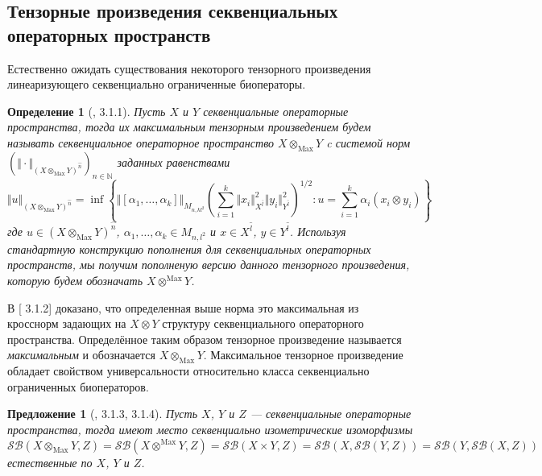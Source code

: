 \documentclass[12pt]{article}
\newtheorem{proposition}[theorem]{Предложение}
\newtheorem{definition}[theorem]{Определение}
\begin{document}
\subsection{Тензорные произведения секвенциальных операторных пространств}

Естественно ожидать существования некоторого тензорного произведения линеаризующего секвенциально ограниченные биоператоры. 
\begin{definition}[\cite{LamOpFolgen}, 3.1.1]\label{DefSQMaxTenProd}
Пусть $X$ и $Y$ секвенциальные операторные пространства, тогда их максимальным тензорным произведением будем называть секвенциальное операторное пространство $X\otimes_{\mathrm{Max}}Y$ c системой норм 
$(\Vert\cdot\Vert_{(X\otimes_{\mathrm{Max}}Y)^{\wideparen{n}}})_{n\in\mathbb{N}}$ заданных равенствами
$$
\Vert u\Vert_{(X\otimes_{\mathrm{Max}}Y)^{\wideparen{n}}}
=\inf\left\{\Vert[\alpha_1,\ldots,\alpha_k]\Vert_{M_{n,kl^2}}\left(\sum\limits_{i=1}^k\Vert x_i\Vert_{X^{\wideparen{l}}}^2\Vert y_i\Vert_{Y^{\wideparen{l}}}^2 \right)^{1/2}:u=\sum\limits_{i=1}^k\alpha_i(x_i\otimes y_i)\right\}
$$
где $u\in (X\otimes_{\mathrm{Max}}Y)^{\wideparen{n}}$, $\alpha_1,\ldots,\alpha_k\in M_{n,l^2}$ и $x\in X^{\wideparen{l}}$, $y\in Y^{\wideparen{l}}$. Используя стандартную конструкцию пополнения 
для секвенциальных операторных пространств, мы получим пополненую версию данного тензорного произведения, которую будем обозначать $X\otimes^{\mathrm{Max}} Y$.
\end{definition}

В [\cite{LamOpFolgen} 3.1.2] доказано, что определенная выше норма это максимальная из кросснорм задающих на $X\otimes Y$ структуру секвенциального операторного пространства. Определённое таким образом 
тензорное произведение называется \textit{максимальным} и обозначается $X \otimes_{\mathrm{Max}} Y$. Максимальное тензорное произведение обладает свойством универсальности относительно класса 
секвенциально ограниченных биоператоров.

\begin{proposition}[\cite{LamOpFolgen}, 3.1.3, 3.1.4]\label{PrSQUnivPropMaxTenProd}
Пусть $X$, $Y$ и $Z$ --- секвенциальные операторные пространства, тогда 	имеют место секвенциально изометрические изоморфизмы
$$
\mathcal{SB}(X\otimes_{\mathrm{Max}}Y, Z)
=\mathcal{SB}(X\otimes^{\mathrm{Max}}Y, Z)
=\mathcal{SB}(X\times Y, Z)
=\mathcal{SB}(X,\mathcal{SB}(Y,Z))
=\mathcal{SB}(Y,\mathcal{SB}(X,Z))
$$
естественные по $X$, $Y$ и $Z$.
\end{proposition}
\end{document}
